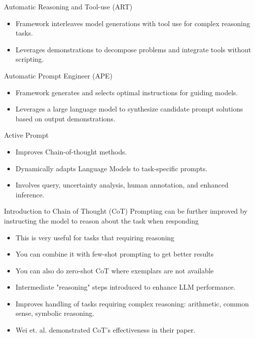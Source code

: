 \begin{frame}[fragile]{Automatic Reasoning and Tool-use (ART)}
    \begin{itemize}
        \item Framework interleaves model generations with tool use for complex reasoning tasks.
        \item Leverages demonstrations to decompose problems and integrate tools without scripting.
    \end{itemize}
\end{frame}

\begin{frame}[fragile]{Automatic Prompt Engineer (APE)}
    \begin{itemize}
        \item Framework generates and selects optimal instructions for guiding models.
        \item Leverages a large language model to synthesize candidate prompt solutions based on output demonstrations.
    \end{itemize}
\end{frame}

\begin{frame}[fragile]{Active Prompt}
    \begin{itemize}
        \item Improves Chain-of-thought methods.
        \item Dynamically adapts Language Models to task-specific prompts.
        \item Involves query, uncertainty analysis, human annotation, and enhanced inference.
    \end{itemize}
\end{frame}

\begin{frame}[fragile]{Introduction to Chain of Thought (CoT)}
Prompting can be further improved by instructing the 
model to reason about the task when responding

    \begin{itemize}
		\item This is very useful for tasks that requiring reasoning 
		\item You can combine it with few-shot prompting to get better results 
		\item You can also do zero-shot CoT where exemplars are not available	
        \item Intermediate "reasoning" steps introduced to enhance LLM performance.
        \item Improves handling of tasks requiring complex reasoning: arithmetic, common sense, symbolic reasoning.
        \item Wei et. al. demonstrated CoT's effectiveness in their paper.
    \end{itemize}
\end{frame}

